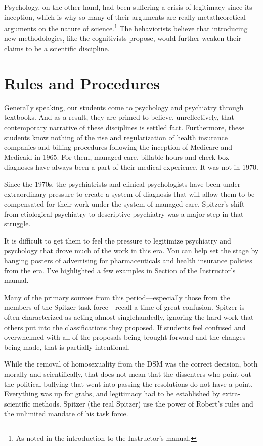 \begin{refsection}
Psychology, on the other hand, had been suffering a crisis of legitimacy since its inception, which is why so many of their arguments are really metatheoretical arguments on the nature of science.\footnote{As noted in the introduction to the Instructor’s manual.} The behaviorists believe that introducing new methodologies, like the cognitivists propose, would further weaken their claims to be a scientific discipline. 

\section{Rules and Procedures}
\label{rulesandprocedures}

Generally speaking, our students come to psychology and psychiatry through textbooks. And as a result, they are primed to believe, unreflectively, that contemporary narrative of these disciplines is settled fact. Furthermore, these students know nothing of the rise and regularization of health insurance companies and billing procedures following the inception of Medicare and Medicaid in 1965. For them, managed care, billable hours and check-box diagnoses have always been a part of their medical experience. It was not in 1970. 

Since the 1970s, the psychiatrists and clinical psychologists have been under extraordinary pressure to create a system of diagnosis that will allow them to be compensated for their work under the system of managed care. Spitzer's shift from etiological psychiatry to descriptive psychiatry was a major step in that struggle. 

It is difficult to get them to feel the pressure to legitimize psychiatry and psychology that drove much of the work in this era. You can help set the stage by hanging posters of advertising for pharmaceuticals and health insurance policies from the era. I've highlighted a few examples in Section  of the Instructor's manual. 

Many of the primary sources from this period---especially those from the members of the Spitzer task force---recall a time of great confusion. Spitzer is often characterized as acting almost singlehandedly, ignoring the hard work that others put into the classifications they proposed. If students feel confused and overwhelmed with all of the proposals being brought forward and the changes being made, that is partially intentional. 

While the removal of homosexuality from the DSM was the correct decision, both morally and scientifically, that does not mean that the dissenters who point out the political bullying that went into passing the resolutions do not have a point. Everything was up for grabs, and legitimacy had to be established by extra-scientific methods. Spitzer (the real Spitzer) use the power of Robert's rules and the unlimited mandate of his task force. 


\end{refsection}
